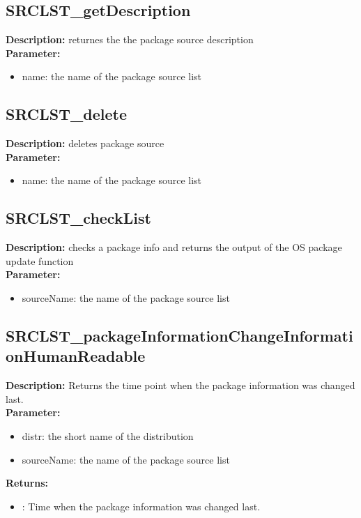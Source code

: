 \subsection{SRCLST\_getDescription}
\textbf{Description:} returnes the the package source description\\
\textbf{Parameter:}
\begin{itemize}
\item name: the name of the package source list
\end{itemize}

\subsection{SRCLST\_delete}
\textbf{Description:} deletes package source\\
\textbf{Parameter:}
\begin{itemize}
\item name: the name of the package source list
\end{itemize}

\subsection{SRCLST\_checkList}
\textbf{Description:} checks a package info and returns the output of the OS package update function\\
\textbf{Parameter:}
\begin{itemize}
\item sourceName: the name of the package source list
\end{itemize}

\subsection{SRCLST\_packageInformationChangeInformationHumanReadable}
\textbf{Description:} Returns the time point when the package information was changed last.\\
\textbf{Parameter:}
\begin{itemize}
\item distr: the short name of the distribution
\item sourceName: the name of the package source list
\end{itemize}
\textbf{Returns:}
\begin{itemize}
\item : Time when the package information was changed last.
\end{itemize}

